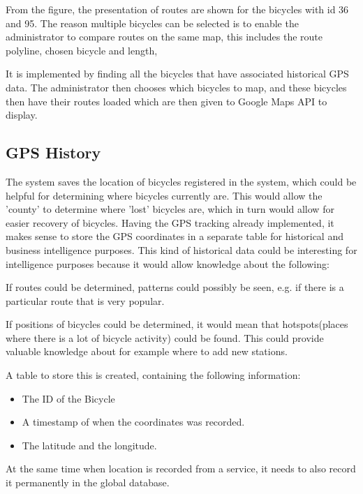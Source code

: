 From the figure, the presentation of routes are shown for the bicycles with id 36 and 95.
The reason multiple bicycles can be selected is to enable the administrator to compare routes on the same map, this includes the route polyline, chosen bicycle and length,

It is implemented by finding all the bicycles that have associated historical GPS data.
 The administrator then chooses which bicycles to map, and these bicycles then have their routes loaded which are then given to Google Maps API to display.


\subsection{GPS History}\label{sec:gpsHistory}
The system saves the location of bicycles registered in the system, which could be helpful for determining where bicycles currently are. 
This would allow the 'county' to determine where 'lost' bicycles are, which in turn would allow for easier recovery of bicycles.
Having the GPS tracking already implemented, it makes sense to store the GPS coordinates in a separate table for historical and business intelligence purposes.
This kind of historical data could be interesting for intelligence purposes because it would allow knowledge about the following:

\begin{description}[style=nextline]
\item[Which routes are used?] If routes could be determined, patterns could possibly be seen, e.g. if there is a particular route that is very popular.
\item[Are there hotspots for bicycles?] If positions of bicycles could be determined, it would mean that hotspots(places where there is a lot of bicycle activity) could be found. 
This could provide valuable knowledge about for example where to add new stations.
\end{description}

A table to store this is created, containing the following information:

\begin{itemize}
\item The ID of the Bicycle
\item A timestamp of when the coordinates was recorded.
\item The latitude and the longitude.
\end{itemize}

At the same time when location is recorded from a service, it needs to also record it permanently in the global database.

